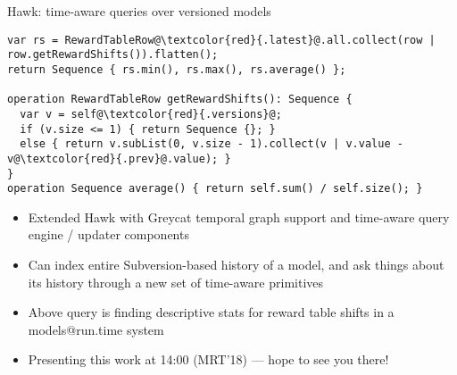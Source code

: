 \begin{frame}[fragile]{Hawk: time-aware queries over versioned models~\cite{hawk-mrt2018}}

  \begin{lstlisting}[frame=tb,language=EOL,escapechar=@,basicstyle=\footnotesize]
var rs = RewardTableRow@\textcolor{red}{.latest}@.all.collect(row | row.getRewardShifts()).flatten();
return Sequence { rs.min(), rs.max(), rs.average() };

operation RewardTableRow getRewardShifts(): Sequence {
  var v = self@\textcolor{red}{.versions}@;
  if (v.size <= 1) { return Sequence {}; }
  else { return v.subList(0, v.size - 1).collect(v | v.value - v@\textcolor{red}{.prev}@.value); }
}
operation Sequence average() { return self.sum() / self.size(); }
  \end{lstlisting}

  \begin{itemize}
  \item Extended Hawk with Greycat temporal graph support and time-aware query
    engine / updater components
  \item Can index entire Subversion-based history of a model, and ask things
    about its history through a new set of time-aware primitives
  \item Above query is finding descriptive stats for reward table shifts in a
    models@run.time system
  \item \alert{Presenting this work at 14:00 (MRT'18) --- hope to see you there!}
  \end{itemize}

\end{frame}

